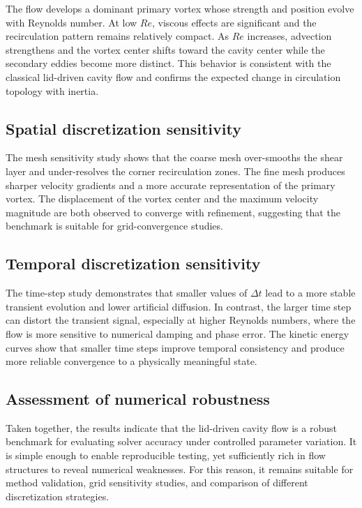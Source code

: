 \documentclass[final,3p,times]{elsarticle}
\begin{document}
The flow develops a dominant primary vortex whose strength and position evolve with Reynolds number. At low $Re$, viscous effects are significant and the recirculation pattern remains relatively compact. As $Re$ increases, advection strengthens and the vortex center shifts toward the cavity center while the secondary eddies become more distinct. This behavior is consistent with the classical lid-driven cavity flow and confirms the expected change in circulation topology with inertia.

\subsection{Spatial discretization sensitivity}

The mesh sensitivity study shows that the coarse mesh over-smooths the shear layer and under-resolves the corner recirculation zones. The fine mesh produces sharper velocity gradients and a more accurate representation of the primary vortex. The displacement of the vortex center and the maximum velocity magnitude are both observed to converge with refinement, suggesting that the benchmark is suitable for grid-convergence studies.

\subsection{Temporal discretization sensitivity}

The time-step study demonstrates that smaller values of $\Delta t$ lead to a more stable transient evolution and lower artificial diffusion. In contrast, the larger time step can distort the transient signal, especially at higher Reynolds numbers, where the flow is more sensitive to numerical damping and phase error. The kinetic energy curves show that smaller time steps improve temporal consistency and produce more reliable convergence to a physically meaningful state.

\subsection{Assessment of numerical robustness}

Taken together, the results indicate that the lid-driven cavity flow is a robust benchmark for evaluating solver accuracy under controlled parameter variation. It is simple enough to enable reproducible testing, yet sufficiently rich in flow structures to reveal numerical weaknesses. For this reason, it remains suitable for method validation, grid sensitivity studies, and comparison of different discretization strategies.
\end{document}
